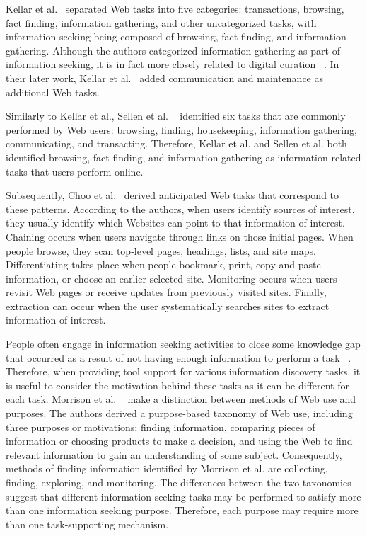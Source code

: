 {{{Kellar et al.~\cite{kellar2006goal} separated Web tasks into five categories: transactions, browsing, fact finding, information gathering, and other uncategorized tasks, with information seeking being composed of browsing, fact finding, and information gathering. Although the authors categorized information gathering as part of information seeking, it is in fact more closely related to digital curation ~\cite{beagrie, wittaker}. In their later work, Kellar et al.~\cite{kellar2007field} added communication and maintenance as additional Web tasks. 

Similarly to Kellar et al., Sellen et al. ~\cite{sellen} identified six tasks that are commonly performed by Web users: browsing, finding, housekeeping, information gathering, communicating, and transacting. Therefore, Kellar et al. and Sellen et al. both identified browsing, fact finding, and information gathering as information-related tasks that users perform online. 

Subsequently, Choo et al.~\cite{choo2000information} derived anticipated Web tasks that correspond to these patterns. According to the authors, when users identify sources of interest, they usually identify which Websites can point to that information of interest.  Chaining occurs when users navigate through links on those initial pages. When people browse, they scan top-level pages, headings, lists, and site maps. Differentiating takes place when people bookmark, print, copy and paste information, or choose an earlier selected site. Monitoring occurs when users revisit Web pages or receive updates from previously visited sites. Finally, extraction can occur when the user systematically searches sites to extract information of interest.  

People often engage in information seeking activities to close some knowledge gap that occurred as a result of not having enough information to perform a task ~\cite{proper}. Therefore, when providing tool support for various information discovery tasks, it is useful to consider the motivation behind these tasks as it can be different for each task. Morrison et al. ~\cite{morrison} make a distinction between methods of Web use and purposes. The authors derived a purpose-based taxonomy of Web use, including three purposes or motivations: finding information, comparing pieces of information or choosing products to make a decision, and using the Web to find relevant information to gain an understanding of some subject. Consequently, methods of finding information identified by Morrison et al. are collecting, finding, exploring, and monitoring. The differences between the two taxonomies suggest that different information seeking tasks may be performed to satisfy more than one information seeking purpose. Therefore, each purpose may require more than one task-supporting mechanism. 

}}}
